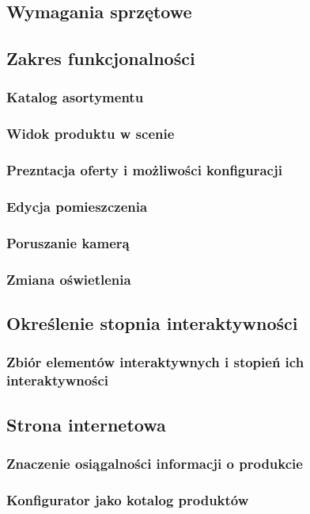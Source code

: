 \documentclass{article} %
\begin{document}
    \subsection{Wymagania sprzętowe}
    \subsection{Zakres funkcjonalności}
        \subsubsection{Katalog asortymentu}
        \subsubsection{Widok produktu w scenie}
        \subsubsection{Prezntacja oferty i możliwości konfiguracji}
        \subsubsection{Edycja pomieszczenia}
        \subsubsection{Poruszanie kamerą}
        \subsubsection{Zmiana oświetlenia}
    \subsection{Określenie stopnia interaktywności}
        \subsubsection{Zbiór elementów interaktywnych i stopień ich interaktywności}
    \subsection{Strona internetowa}
        \subsubsection{Znaczenie osiągalności informacji o produkcie}
        \subsubsection{Konfigurator jako kotalog produktów}
\end{document}
